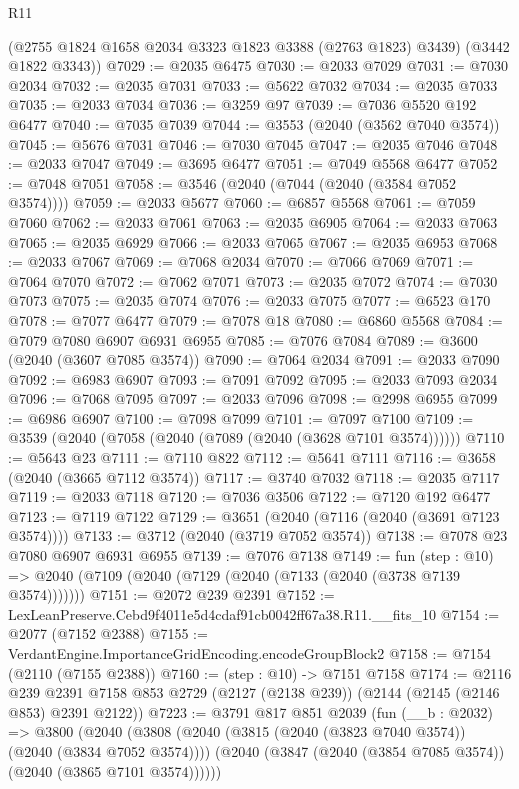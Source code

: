 \begin{lexlean}{R11}
\begin{coremodule}
      (@2755 @1824 @1658 @2034 @3323 @1823 @3388 (@2763 @1823) @3439)
      (@3442 @1822 @3343))
@7029 := @2035 @6475
@7030 := @2033 @7029
@7031 := @7030 @2034
@7032 := @2035 @7031
@7033 := @5622 @7032
@7034 := @2035 @7033
@7035 := @2033 @7034
@7036 := @3259 @97
@7039 := @7036 @5520 @192 @6477
@7040 := @7035 @7039
@7044 := @3553 (@2040 (@3562 @7040 @3574))
@7045 := @5676 @7031
@7046 := @7030 @7045
@7047 := @2035 @7046
@7048 := @2033 @7047
@7049 := @3695 @6477
@7051 := @7049 @5568 @6477
@7052 := @7048 @7051
@7058 := @3546 (@2040 (@7044 (@2040 (@3584 @7052 @3574))))
@7059 := @2033 @5677
@7060 := @6857 @5568
@7061 := @7059 @7060
@7062 := @2033 @7061
@7063 := @2035 @6905
@7064 := @2033 @7063
@7065 := @2035 @6929
@7066 := @2033 @7065
@7067 := @2035 @6953
@7068 := @2033 @7067
@7069 := @7068 @2034
@7070 := @7066 @7069
@7071 := @7064 @7070
@7072 := @7062 @7071
@7073 := @2035 @7072
@7074 := @7030 @7073
@7075 := @2035 @7074
@7076 := @2033 @7075
@7077 := @6523 @170
@7078 := @7077 @6477
@7079 := @7078 @18
@7080 := @6860 @5568
@7084 := @7079 @7080 @6907 @6931 @6955
@7085 := @7076 @7084
@7089 := @3600 (@2040 (@3607 @7085 @3574))
@7090 := @7064 @2034
@7091 := @2033 @7090
@7092 := @6983 @6907
@7093 := @7091 @7092
@7095 := @2033 @7093 @2034
@7096 := @7068 @7095
@7097 := @2033 @7096
@7098 := @2998 @6955
@7099 := @6986 @6907
@7100 := @7098 @7099
@7101 := @7097 @7100
@7109 := @3539 (@2040 (@7058 (@2040 (@7089 (@2040 (@3628 @7101 @3574))))))
@7110 := @5643 @23
@7111 := @7110 @822
@7112 := @5641 @7111
@7116 := @3658 (@2040 (@3665 @7112 @3574))
@7117 := @3740 @7032
@7118 := @2035 @7117
@7119 := @2033 @7118
@7120 := @7036 @3506
@7122 := @7120 @192 @6477
@7123 := @7119 @7122
@7129 := @3651 (@2040 (@7116 (@2040 (@3691 @7123 @3574))))
@7133 := @3712 (@2040 (@3719 @7052 @3574))
@7138 := @7078 @23 @7080 @6907 @6931 @6955
@7139 := @7076 @7138
@7149 := fun (step : @10) =>
  @2040 (@7109 (@2040 (@7129 (@2040 (@7133 (@2040 (@3738 @7139 @3574)))))))
@7151 := @2072 @239 @2391
@7152 := LexLeanPreserve.Cebd9f4011e5d4cdaf91cb0042ff67a38.R11.__fits_10
@7154 := @2077 (@7152 @2388)
@7155 := VerdantEngine.ImportanceGridEncoding.encodeGroupBlock2
@7158 := @7154 (@2110 (@7155 @2388))
@7160 := (step : @10) -> @7151 @7158
@7174 := @2116
    @239
    @2391
    @7158
    @853
    @2729
    (@2127 (@2138 @239))
    (@2144 (@2145 (@2146 @853) @2391 @2122))
@7223 := @3791
    @817
    @851
    @2039
    (fun (__b : @2032) =>
    @3800
      (@2040
        (@3808
          (@2040 (@3815 (@2040 (@3823 @7040 @3574)) (@2040 (@3834 @7052 @3574))))
          (@2040 (@3847 (@2040 (@3854 @7085 @3574)) (@2040 (@3865 @7101 @3574))))))

\end{coremodule}
\end{lexlean}

